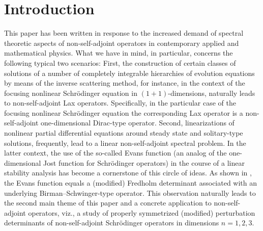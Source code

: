 \documentclass[reqno,10pt, centertags]{amsart}
\newcommand{\lb}{\label}
\numberwithin{equation}{section}
\theoremstyle{definition}
\begin{document}
\maketitle

{\scriptsize{\tableofcontents}}

\section{Introduction} \lb{s1}

This paper has been written in response to the increased demand of
spectral theoretic aspects of non-self-adjoint operators in contemporary
applied and mathematical physics. What we have in mind, in particular,
concerns the following typical two scenarios: First, the construction of
certain classes of solutions of a number of completely integrable
hierarchies of evolution equations by means of the inverse scattering
method, for instance, in the context of the focusing nonlinear
Schr\"odinger equation in $(1+1)$-dimensions, naturally leads to
non-self-adjoint Lax operators. Specifically, in the particular case of
the focusing nonlinear Schr\"odinger equation the corresponding Lax
operator is a  non-self-adjoint one-dimensional Dirac-type operator.
Second, linearizations of nonlinear partial
differential equations around steady state and solitary-type solutions,
frequently, lead to a linear non-self-adjoint spectral problem. In the
latter context, the use of the so-called Evans function (an analog of the
one-dimensional Jost function for Schr\"odinger operators) in the course
of a linear stability  analysis has become a cornerstone of this circle of
ideas. As shown in \cite{GLM06}, the Evans function equals a (modified)
Fredholm determinant associated with an underlying Birman--Schwinger-type
operator. This observation naturally leads to the second main theme
of this paper and a concrete application to non-self-adjoint operators,
viz., a study of properly symmetrized (modified) perturbation
determinants of non-self-adjoint Schr\"odinger operators in dimensions
$n=1,2,3$.
\end{document}
